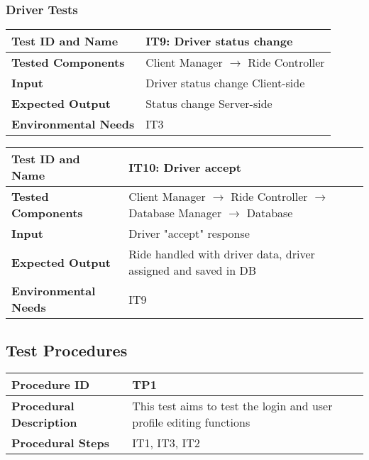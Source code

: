 \subsubsection{Driver Tests}

\begin{tabular}{l p{}}
    \hline
    \textbf{Test ID and Name} & \textbf{IT9: Driver status change}\\
    \hline
    \textbf{Tested Components} & Client Manager $\rightarrow$ Ride Controller\\
    \hline
    \textbf{Input} & Driver status change Client-side\\
    \hline
    \textbf{Expected Output} & Status change Server-side\\
    \hline
    \textbf{Environmental Needs} & IT3\\
    \hline
\end{tabular}

\vspace{2em}

\noindent\begin{tabular}{l p{}}
    \hline
    \textbf{Test ID and Name} & \textbf{IT10: Driver accept}\\
    \hline
    \textbf{Tested Components} & Client Manager $\rightarrow$ Ride Controller $\rightarrow$ Database Manager $\rightarrow$ Database\\
    \hline
    \textbf{Input} & Driver "accept" response\\
    \hline
    \textbf{Expected Output} & Ride handled with driver data, driver assigned and saved in DB\\
    \hline
    \textbf{Environmental Needs} & IT9\\
    \hline
\end{tabular}

\newpage

\subsection{Test Procedures}

\noindent\begin{tabular}{l p{}}
    \hline
    \textbf{Procedure ID} & \textbf{TP1}\\
    \hline
    \textbf{Procedural Description} & This test aims to test the login and user profile editing functions \\
    \hline
    \textbf{Procedural Steps} & IT1, IT3, IT2\\
	\hline
\end{tabular}

